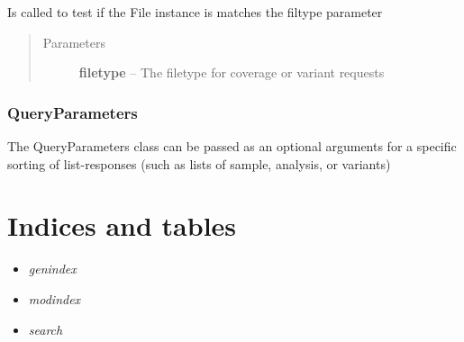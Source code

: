 \documentclass[letterpaper,10pt,english]{sphinxmanual}
\begin{document}
\begin{fulllineitems}
\begin{fulllineitems}
\label{Available modules:BaseSpacePy.model.File.File.isValidFileOption}
Is called to test if the File instance is matches the filtype parameter
\begin{quote}\begin{description}
\item[{Parameters}] \leavevmode
\textbf{filetype} -- The filetype for coverage or variant requests

\end{description}\end{quote}

\end{fulllineitems}


\end{fulllineitems}



\subsection{QueryParameters}
\label{Available modules:queryparameters}

\begin{fulllineitems}
\label{Available modules:BaseSpacePy.model.QueryParameters.QueryParameters}
The QueryParameters class can be passed as an optional arguments for a specific sorting of list-responses (such as lists of sample, analysis, or variants)

\end{fulllineitems}



\chapter{Indices and tables}
\label{index:indices-and-tables}\begin{itemize}
\item {} 
\emph{genindex}

\item {} 
\emph{modindex}

\item {} 
\emph{search}

\end{itemize}



\renewcommand{\indexname}{Index}
\printindex
\end{document}
